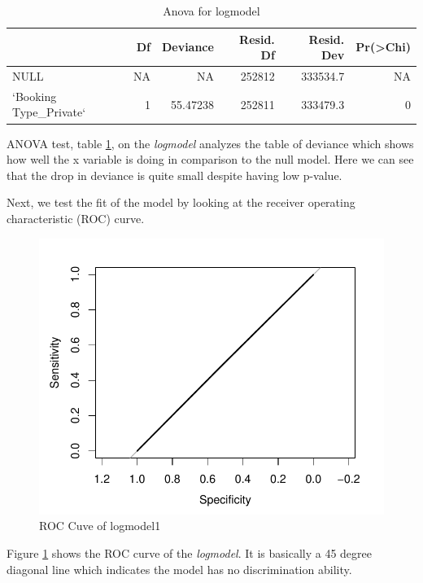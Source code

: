 \documentclass[11pt,a4paper,]{article}
\begin{document}
\begin{table}

\caption{\label{tab:anova}Anova for logmodel}
\centering
\begin{tabular}[t]{lrrrrr}
\toprule
  & Df & Deviance & Resid. Df & Resid. Dev & Pr(>Chi)\\
\midrule
NULL & NA & NA & 252812 & 333534.7 & NA\\
`Booking Type\_Private` & 1 & 55.47238 & 252811 & 333479.3 & 0\\
\bottomrule
\end{tabular}
\end{table}

ANOVA test, table \ref{tab:anova}, on the \emph{logmodel} analyzes the table of deviance which shows how well the x variable is doing in comparison to the null model. Here we can see that the drop in deviance is quite small despite having low p-value.

Next, we test the fit of the model by looking at the receiver operating characteristic (ROC) curve.

\begin{figure}

{\centering \includegraphics{Assignment4_files/figure-latex/roc-1} 

}

\caption{ROC Cuve of logmodel1}\label{fig:roc}
\end{figure}

Figure \ref{fig:roc} shows the ROC curve of the \emph{logmodel}. It is basically a 45 degree diagonal line which indicates the model has no discrimination ability.
\end{document}
